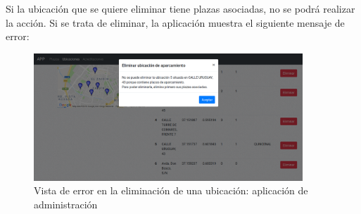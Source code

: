 Si la ubicación que se quiere eliminar tiene plazas asociadas, no se podrá realizar la acción. Si se trata de eliminar, la aplicación muestra el siguiente mensaje de error:
\begin{figure}[H]
	\centering
	\includegraphics[width=0.9\textwidth]{imagenes/administracion/ubicaciones_eliminar_error.png}
	\caption{Vista de error en la eliminación de una ubicación: aplicación de administración}
	\label{administracion_ubicaciones_eliminar_error}
\end{figure}

